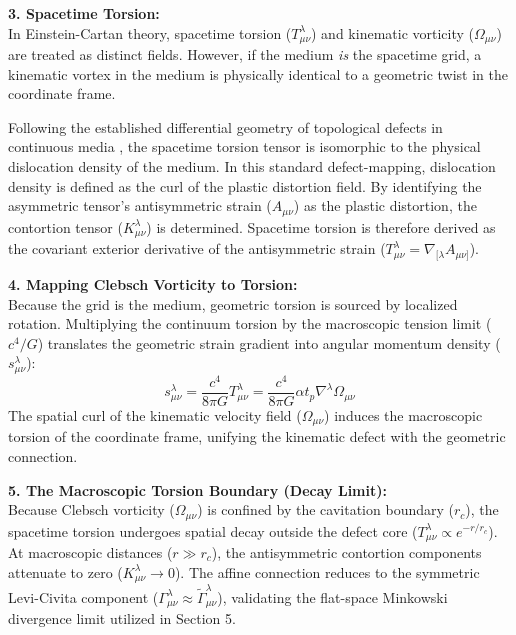 \vspace{0.2 cm}


\textbf{3. Spacetime Torsion:} \\
In Einstein-Cartan theory, spacetime torsion ($T^\lambda_{\mu\nu}$) and kinematic vorticity ($\Omega_{\mu\nu}$) are treated as distinct fields.   However, if the medium \textit{is} the spacetime grid, a kinematic vortex in the medium is physically identical to a geometric twist in the coordinate frame. 

Following the established differential geometry of topological defects in continuous media \cite{kroner1981continuum, kleinert2008multivalued, katanaev1992theory}, the spacetime torsion tensor is isomorphic to the physical dislocation density of the medium. In this standard defect-mapping, dislocation density is defined as the curl of the plastic distortion field. By identifying the asymmetric tensor's antisymmetric strain ($A_{\mu\nu}$) as the plastic distortion, the contortion tensor ($K^\lambda_{\mu\nu}$) is determined.  Spacetime torsion is therefore derived as the covariant exterior derivative of the antisymmetric strain ($T^\lambda_{\mu\nu} = \nabla_{[\lambda} A_{\mu\nu]}$). 

\vspace{0.2 cm}

\textbf{4. Mapping Clebsch Vorticity to Torsion:} \\
Because the grid is the medium, geometric torsion is sourced by localized rotation. Multiplying the continuum torsion by the macroscopic tension limit ($c^4/G$) translates the geometric strain gradient into angular momentum density ($s^\lambda_{\mu\nu}$): 
\begin{equation}
    s^\lambda_{\mu\nu} = \frac{c^4}{8\pi G} T^\lambda_{\mu\nu} = \frac{c^4}{8\pi G} \alpha t_p \nabla^\lambda \Omega_{\mu\nu} 
\end{equation}
The spatial curl of the kinematic velocity field ($\Omega_{\mu\nu}$) induces the macroscopic torsion of the coordinate frame, unifying the kinematic defect with the geometric connection.


\textbf{5. The Macroscopic Torsion Boundary (Decay Limit):} \\ 
Because Clebsch vorticity ($\Omega_{\mu\nu}$) is confined by the cavitation boundary ($r_c$), the spacetime torsion undergoes spatial decay outside the defect core ($T^\lambda_{\mu\nu} \propto e^{-r/r_c}$). At macroscopic distances ($r \gg r_c$), the antisymmetric contortion components attenuate to zero ($K^\lambda_{\mu\nu} \to 0$). The affine connection reduces to the symmetric Levi-Civita component ($\Gamma^\lambda_{\mu\nu} \approx \tilde{\Gamma}^\lambda_{\mu\nu}$), validating the flat-space Minkowski divergence limit utilized in Section 5. 

